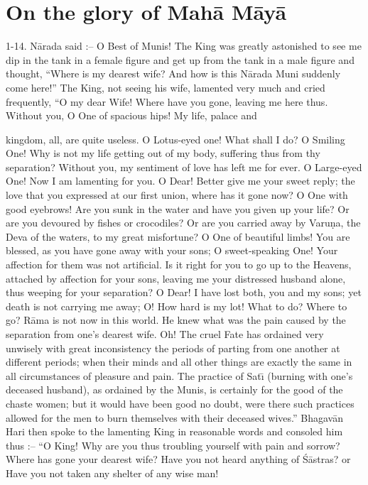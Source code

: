 \chapter{On the glory of Mah\=a M\=ay\=a}

1-14. N\=arada said :-- O Best of Munis! The King was greatly astonished to see me dip in the tank in a female figure and get up from the tank in a male figure and thought, ``Where is my dearest wife? And how is this N\=arada Muni suddenly come here!'' The King, not seeing his wife, lamented very much and cried frequently, ``O my dear Wife! Where have you gone, leaving me here thus. Without you, O One of spacious hips! My life, palace and

kingdom, all, are quite useless. O Lotus-eyed one! What shall I do? O Smiling One! Why is not my life getting out of my body, suffering thus from thy separation? Without you, my sentiment of love has left me for ever. O Large-eyed One! Now I am lamenting for you. O Dear! Better give me your sweet reply; the love that you expressed at our first union, where has it gone now? O One with good eyebrows! Are you sunk in the water and have you given up your life? Or are you devoured by fishes or crocodiles? Or are you carried away by Varu\d{n}a, the Deva of the waters, to my great misfortune? O One of beautiful limbs! You are blessed, as you have gone away with your sons; O sweet-speaking One! Your affection for them was not artificial. Is it right for you to go up to the Heavens, attached by affection for your sons, leaving me your distressed husband alone, thus weeping for your separation? O Dear! I have lost both, you and my sons; yet death is not carrying me away; O! How hard is my lot! What to do? Where to go? R\=ama is not now in this world. He knew what was the pain caused by the separation from one's dearest wife. Oh! The cruel Fate has ordained very unwisely with great inconsistency the periods of parting from one another at different periods; when their minds and all other things are exactly the same in all circumstances of pleasure and pain. The practice of Sat\={\i} (burning with one's deceased husband), as ordained by the Munis, is certainly for the good of the chaste women; but it would have been good no doubt, were there such practices allowed for the men to burn themselves with their deceased wives.'' Bhagav\=an Hari then spoke to the lamenting King in reasonable words and consoled him thus :-- ``O King! Why are you thus troubling yourself with pain and sorrow? Where has gone your dearest wife? Have you not heard anything of \'S\=astras? or Have you not taken any shelter of any wise man!

